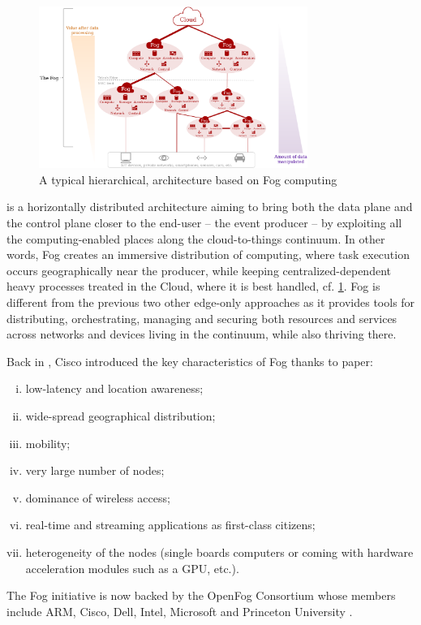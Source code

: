 \begin{description}[leftmargin=10pt]
	\begin{figure}[t]
		\centering
		\includegraphics[width=0.78\textwidth]{./assets/FogArchitecture.drawio.png}
		\caption{A typical hierarchical, architecture based on Fog computing \cite{ieee_standards_association_ieee_2018}}
		\label{fig:fog_archi}
	\end{figure}
	
	\item[Fog computing] is a horizontally distributed architecture aiming to bring both the data plane and the control plane closer to the end-user -- the event producer -- by exploiting all the computing-enabled places along the cloud-to-things continuum. In other words, Fog creates an immersive distribution of computing, where task execution occurs geographically near the producer, while keeping centralized-dependent heavy processes treated in the Cloud, where it is best handled, cf. \cref{fig:fog_archi}. Fog is different from the previous two other edge-only approaches as it provides tools for distributing, orchestrating, managing and securing both resources and services across networks and devices living in the continuum, while also thriving there.
	
	Back in , Cisco introduced the key characteristics of Fog thanks to  paper:
	\begin{enumerate}[(i)]
		\item low-latency and location awareness;
		\item wide-spread geographical distribution;
		\item mobility;
		\item very large number of nodes;
		\item dominance of wireless access;
		\item real-time and streaming applications as first-class citizens;
		\item heterogeneity of the nodes (single boards computers or coming with hardware acceleration modules such as a \gls{GPU}, etc.).
	\end{enumerate}
	The Fog initiative is now backed by the OpenFog Consortium \cite{ieee_standards_association_ieee_2018} whose members include ARM, Cisco, Dell, Intel, Microsoft and Princeton University \cite{chiang_fog_2016}.
\end{description}

